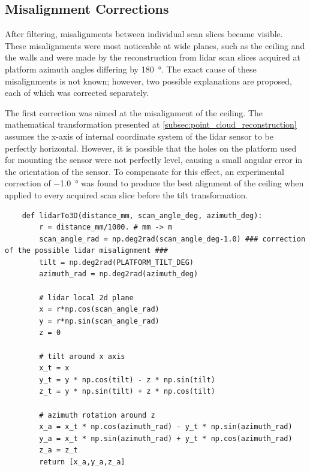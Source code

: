 \subsection{Misalignment Corrections}
\label{subsec:misalignment_corrections}
After filtering, misalignments between individual scan slices became visible. 
These misalignments were most noticeable at wide planes, such as the ceiling and the walls and were made by the reconstruction from \gls{lidar} scan slices acquired at platform azimuth angles differing by \SI{180}{\degree}.
The exact cause of these misalignments is not known; however, two possible explanations are proposed, each of which was corrected separately.

The first correction was aimed at the misalignment of the ceiling.
The mathematical transformation presented at \cref{subsec:point_cloud_reconstruction} assumes the x-axis of internal coordinate system of the \gls{lidar} sensor to be perfectly horizontal.
However, it is possible that the holes on the platform used for mounting the sensor were not perfectly level, causing a small angular error in the orientation of the sensor.
To compensate for this effect, an experimental correction of \SI{-1,0}{\degree} was found to produce the best alignment of the ceiling when applied to every acquired scan slice before the tilt transformation.

\begin{listing}[H]
\caption{Code snippet with the compensation for assumed \gls{lidar} misalignment}
\begin{verbatim}
    def lidarTo3D(distance_mm, scan_angle_deg, azimuth_deg):
        r = distance_mm/1000. # mm -> m
        scan_angle_rad = np.deg2rad(scan_angle_deg-1.0) ### correction of the possible lidar misalignment ###
        tilt = np.deg2rad(PLATFORM_TILT_DEG)
        azimuth_rad = np.deg2rad(azimuth_deg)

        # lidar local 2d plane
        x = r*np.cos(scan_angle_rad)
        y = r*np.sin(scan_angle_rad)
        z = 0 

        # tilt around x axis
        x_t = x
        y_t = y * np.cos(tilt) - z * np.sin(tilt)
        z_t = y * np.sin(tilt) + z * np.cos(tilt)

        # azimuth rotation around z
        x_a = x_t * np.cos(azimuth_rad) - y_t * np.sin(azimuth_rad)
        y_a = x_t * np.sin(azimuth_rad) + y_t * np.cos(azimuth_rad)
        z_a = z_t
        return [x_a,y_a,z_a]
\end{verbatim}
\end{listing}

